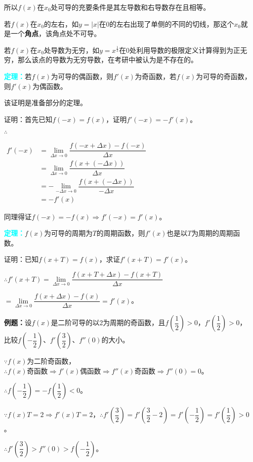 \documentclass[UTF8, 12pt]{ctexart}
\begin{document}
所以$f(x)$在$x_0$处可导的充要条件是其左导数和右导数存在且相等。

若$f(x)$在$x_0$的左右，如$y=\vert x\vert$在$0$的左右出现了单侧的不同的切线，那这个$x_0$就是一个\textbf{角点}，该角点处不可导。

若$f(x)$在$x_0$处导数为无穷，如$y=x^{\frac{1}{3}}$在$0$处利用导数的极限定义计算得到为正无穷，那么该点的导数为无穷导数，在考研中被认为是不存在的。

\textcolor{aqua}{\textbf{定理：}}若$f(x)$为可导的偶函数，则$f'(x)$为奇函数，若$f(x)$为可导的奇函数，则$f'(x)$为偶函数。

该证明是准备部分的定理。

证明：首先已知$f(-x)=f(x)$，证明$f'(-x)=-f'(x)$。

$\therefore$

$
\begin{aligned}
    f'(-x) &=\lim\limits_{\Delta x\to 0}\dfrac{f(-x+\Delta x)-f(-x)}{\Delta x} \\
    & =\lim\limits_{\Delta x\to 0}\dfrac{f(x+(-\Delta x))}{\Delta x} \\
    & =-\lim\limits_{-\Delta x\to 0}\dfrac{f(x+(-\Delta x))}{-\Delta x} \\
    & =-f'(x)
\end{aligned}
$

同理得证$f(-x)=-f(x)\Rightarrow f'(-x)=f'(x)$。

\textcolor{aqua}{\textbf{定理：}}$f(x)$为可导的周期为$T$的周期函数，则$f'(x)$也是以$T$为周期的周期函数。

证明：已知$f(x+T)=f(x)$，求证$f'(x+T)=f'(x)$。\medskip

$\therefore f'(x+T)=\lim\limits_{\Delta x\to 0}\dfrac{f(x+T+\Delta x)-f(x+T)}{\Delta x}$

$=\lim\limits_{\Delta x\to 0}\dfrac{f(x+\Delta x)-f(x)}{\Delta x}=f'(x)$。

\textbf{例题：}设$f(x)$是二阶可导的以2为周期的奇函数，且$f(\dfrac{1}{2})>0$，$f'(\dfrac{1}{2})>0$，比较$f(-\dfrac{1}{2})$、$f'(\dfrac{3}{2})$、$f''(0)$的大小。\medskip

$\because f(x)$为二阶奇函数，$\therefore f(x)\text{奇函数}\Rightarrow f'(x)\text{偶函数}\Rightarrow f''(x)\text{奇函数}\Rightarrow f''(0)=0$。

$\therefore f(-\dfrac{1}{2})=-f(\dfrac{1}{2})<0$。

$\because f(x)T=2\Rightarrow f'(x)T=2$，$\therefore f'(\dfrac{3}{2})=f'(\dfrac{3}{2}-2)=f'(-\dfrac{1}{2})=f'(\dfrac{1}{2})>0$。

$\therefore f'(\dfrac{3}{2})>f''(0)>f(-\dfrac{1}{2})$。\medskip
\end{document}
